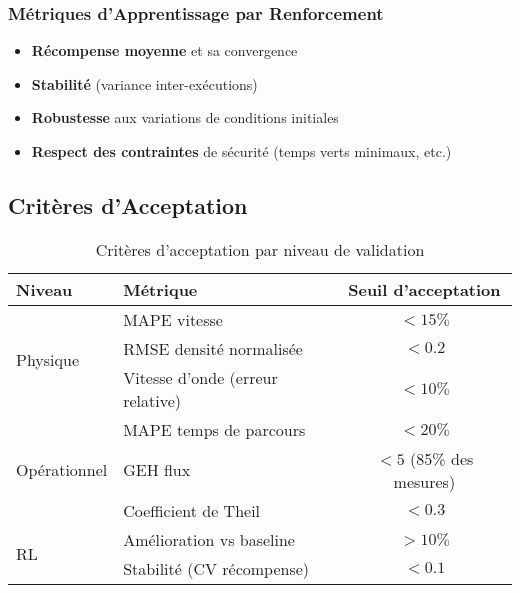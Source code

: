 \subsubsection{Métriques d'Apprentissage par Renforcement}
\begin{itemize}
    \item \textbf{Récompense moyenne} et sa convergence
    \item \textbf{Stabilité} (variance inter-exécutions)
    \item \textbf{Robustesse} aux variations de conditions initiales
    \item \textbf{Respect des contraintes} de sécurité (temps verts minimaux, etc.)
\end{itemize}

\subsection{Critères d'Acceptation}
\label{subsec:criteres_acceptation}

\begin{table}[htbp]
    \centering
    \caption{Critères d'acceptation par niveau de validation}
    \label{tab:criteres_acceptation}
    \begin{tabular}{|l|l|c|}
        \hline
        \textbf{Niveau}               & \textbf{Métrique}                & \textbf{Seuil d'acceptation} \\
        \hline
        \multirow{3}{*}{Physique}     & MAPE vitesse                     & $< 15\%$                     \\
                                      & RMSE densité normalisée          & $< 0.2$                      \\
                                      & Vitesse d'onde (erreur relative) & $< 10\%$                     \\
        \hline
        \multirow{3}{*}{Opérationnel} & MAPE temps de parcours           & $< 20\%$                     \\
                                      & GEH flux                         & $< 5$ (85\% des mesures)     \\
                                      & Coefficient de Theil             & $< 0.3$                      \\
        \hline
        \multirow{2}{*}{RL}           & Amélioration vs baseline         & $> 10\%$                     \\
                                      & Stabilité (CV récompense)        & $< 0.1$                      \\
        \hline
    \end{tabular}
\end{table}

